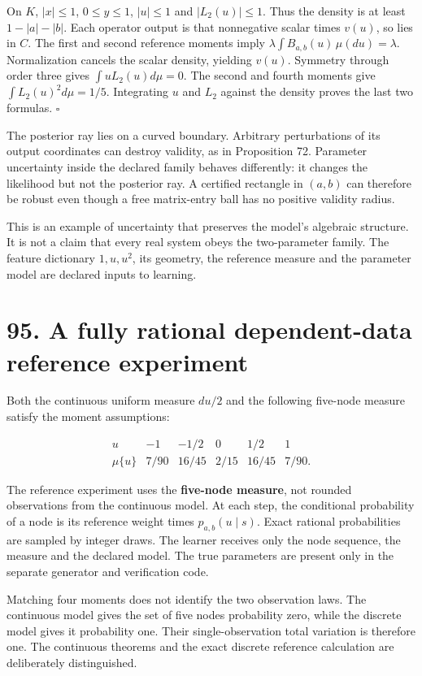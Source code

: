 \documentclass[11pt,letterpaper]{article}
\begin{document}
On \(K\), \(|x|\leq1\), \(0\leq y\leq1\), \(|u|\leq1\) and
\(|L_2(u)|\leq1\). Thus the density is at least \(1-|a|-|b|\). Each
operator output is that nonnegative scalar times \(v(u)\), so lies in
\(C\). The first and second reference moments imply
\(\lambda\int B_{a,b}(u)\,\mu(du)=\lambda\). Normalization cancels the
scalar density, yielding \(v(u)\). Symmetry through order three gives
\(\int uL_2(u)d\mu=0\). The second and fourth moments give
\(\int L_2(u)^2d\mu=1/5\). Integrating \(u\) and \(L_2\) against the
density proves the last two formulas. \(\square\)

The posterior ray lies on a curved boundary. Arbitrary perturbations of
its output coordinates can destroy validity, as in Proposition 72.
Parameter uncertainty inside the declared family behaves differently: it
changes the likelihood but not the posterior ray. A certified rectangle
in \((a,b)\) can therefore be robust even though a free matrix-entry
ball has no positive validity radius.

This is an example of uncertainty that preserves the model's algebraic
structure. It is not a claim that every real system obeys the
two-parameter family. The feature dictionary \(1,u,u^2\), its geometry,
the reference measure and the parameter model are declared inputs to
learning.

\section{95. A fully rational dependent-data reference
experiment}\label{a-fully-rational-dependent-data-reference-experiment}

Both the continuous uniform measure \(du/2\) and the following five-node
measure satisfy the moment assumptions:

\[
\begin{array}{c|rrrrr}
u&-1&-1/2&0&1/2&1\\\hline
\mu\{u\}&7/90&16/45&2/15&16/45&7/90.
\end{array}
\]

The reference experiment uses the \textbf{five-node measure}, not
rounded observations from the continuous model. At each step, the
conditional probability of a node is its reference weight times
\(p_{a,b}(u\mid s)\). Exact rational probabilities are sampled by
integer draws. The learner receives only the node sequence, the measure
and the declared model. The true parameters are present only in the
separate generator and verification code.

Matching four moments does not identify the two observation laws. The
continuous model gives the set of five nodes probability zero, while the
discrete model gives it probability one. Their single-observation total
variation is therefore one. The continuous theorems and the exact
discrete reference calculation are deliberately distinguished.
\end{document}
